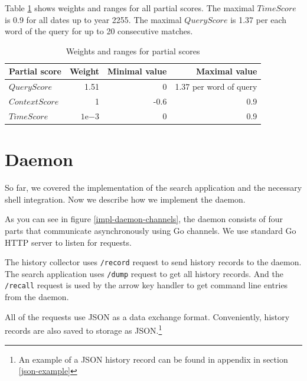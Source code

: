 Table \ref{tab:score-weights-ranges} shows weights and ranges for all partial scores. The maximal \(TimeScore\) is 0.9 for all dates up to year 2255. The maximal \(QueryScore\) is 1.37 per each word of the query for up to 20 consecutive matches. 


\begin{table}[h!]
\centering
\begin{tabular}{lrrr}
\hline \hline
Partial score & Weight & Minimal value & Maximal value \\
\hline
$QueryScore$ & 1.51 & 0 & 1.37 per word of query  \\ 
$ContextScore$ & 1 & -0.6 & 0.9 \\ 
$TimeScore$ & $1\mathrm{e}{-3}$ & 0 & 0.9 \\
\hline \hline
\end{tabular}
\caption{Weights and ranges for partial scores}
\label{tab:score-weights-ranges}
\end{table}

\newpage
\section{Daemon}

So far, we covered the implementation of the search application and the necessary shell integration. Now we describe how we implement the daemon.


As you can see in figure \ref{impl-daemon-channels}, the daemon consists of four parts that communicate asynchronously using Go channels\cite{lib-go-channels}. We use standard Go HTTP server\cite{lib-go-http} to listen for requests. 

The history collector uses \verb|/record| request to send history records to the daemon. The search application uses \verb|/dump| request to get all history records. And the \verb|/recall| request is used by the arrow key handler to get command line entries from the daemon. 

All of the requests use JSON as a data exchange format. Conveniently, history records are also saved to storage as JSON.\footnote{An example of a JSON history record can be found in appendix in section \ref{json-example}} 

